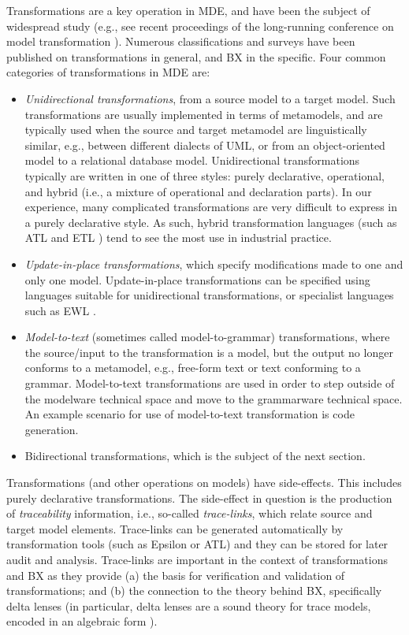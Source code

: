 Transformations are a key operation in MDE, and have been the subject of widespread study (e.g., see recent proceedings of the long-running conference on model transformation \cite{icmt2016}). Numerous classifications and surveys have been published on transformations in general, and BX in the specific. Four common categories of transformations in MDE are:
\begin{itemize}
\item \textit{Unidirectional transformations}, from a source model to a target model. Such transformations are usually implemented in terms of metamodels, and are typically used when the source and target metamodel are linguistically similar, e.g., between different dialects of UML, or from an object-oriented model to a relational database model. Unidirectional transformations typically are written in one of three styles: purely declarative, operational, and hybrid (i.e., a mixture of operational and declaration parts). In our experience, many complicated transformations are very difficult to express in a purely declarative style. As such, hybrid transformation languages (such as ATL \cite{JouaultABK08} and ETL \cite{Kolovos2008}) tend to see the most use in industrial practice.

\item \textit{Update-in-place transformations}, which specify modifications made to one and only one model. Update-in-place transformations can be specified using languages suitable for unidirectional transformations, or specialist languages such as EWL \cite{KolovosPPR07}.

\item \textit{Model-to-text} (sometimes called model-to-grammar) transformations, where the source/input to the transformation is a model, but the output no longer conforms to a metamodel, e.g., free-form text or text conforming to a grammar. Model-to-text transformations are used in order to step outside of the modelware technical space and move to the grammarware technical space. An example scenario for use of model-to-text transformation is code generation.

\item Bidirectional transformations, which is the subject of the next section.
\end{itemize}
Transformations (and other operations on models) have side-effects. This includes purely declarative transformations. The side-effect in question is the production of \textit{traceability} information, i.e., so-called \textit{trace-links}, which relate source and target model elements. Trace-links can be generated automatically by transformation tools (such as Epsilon or ATL) and they can be stored for later audit and analysis. Trace-links are important in the context of transformations and BX as they provide (a) the basis for verification and validation of transformations; and (b) the connection to the theory behind BX, specifically delta lenses (in particular, delta lenses are a sound theory for trace models, encoded in an algebraic form \cite{DiskinXC10}).

